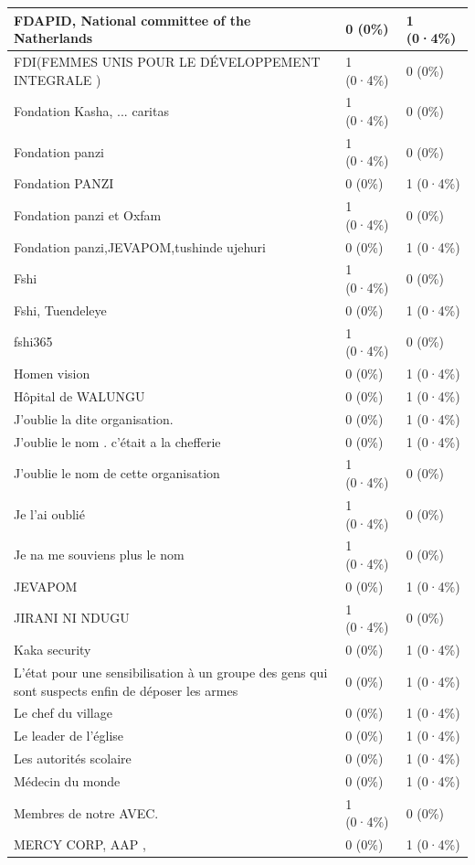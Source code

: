 \documentclass[
]{book}
\begin{document}
\begin{tabular}{l|l|l}
\hline
FDAPID, National committee of the Natherlands & 0 (0\%) & 1 (0·4\%)\\
\hline
FDI(FEMMES UNIS POUR LE DÉVELOPPEMENT INTEGRALE ) & 1 (0·4\%) & 0 (0\%)\\
\hline
Fondation Kasha, ... caritas & 1 (0·4\%) & 0 (0\%)\\
\hline
Fondation panzi & 1 (0·4\%) & 0 (0\%)\\
\hline
Fondation PANZI & 0 (0\%) & 1 (0·4\%)\\
\hline
Fondation panzi et Oxfam & 1 (0·4\%) & 0 (0\%)\\
\hline
Fondation panzi,JEVAPOM,tushinde ujehuri & 0 (0\%) & 1 (0·4\%)\\
\hline
Fshi & 1 (0·4\%) & 0 (0\%)\\
\hline
Fshi, Tuendeleye & 0 (0\%) & 1 (0·4\%)\\
\hline
fshi365 & 1 (0·4\%) & 0 (0\%)\\
\hline
Homen vision & 0 (0\%) & 1 (0·4\%)\\
\hline
Hôpital de WALUNGU & 0 (0\%) & 1 (0·4\%)\\
\hline
J'oublie la dite organisation. & 0 (0\%) & 1 (0·4\%)\\
\hline
J'oublie le nom . c'était a la chefferie & 0 (0\%) & 1 (0·4\%)\\
\hline
J'oublie le nom de cette organisation & 1 (0·4\%) & 0 (0\%)\\
\hline
Je l'ai oublié & 1 (0·4\%) & 0 (0\%)\\
\hline
Je na me souviens plus le nom & 1 (0·4\%) & 0 (0\%)\\
\hline
JEVAPOM & 0 (0\%) & 1 (0·4\%)\\
\hline
JIRANI NI NDUGU & 1 (0·4\%) & 0 (0\%)\\
\hline
Kaka security & 0 (0\%) & 1 (0·4\%)\\
\hline
L'état pour une sensibilisation à un  groupe des gens qui sont suspects enfin de déposer les armes & 0 (0\%) & 1 (0·4\%)\\
\hline
Le chef du village & 0 (0\%) & 1 (0·4\%)\\
\hline
Le leader de l'église & 0 (0\%) & 1 (0·4\%)\\
\hline
Les autorités scolaire & 0 (0\%) & 1 (0·4\%)\\
\hline
Médecin du monde & 0 (0\%) & 1 (0·4\%)\\
\hline
Membres de notre AVEC. & 1 (0·4\%) & 0 (0\%)\\
\hline
MERCY CORP, AAP , & 0 (0\%) & 1 (0·4\%)\\

\end{tabular}
\end{document}
